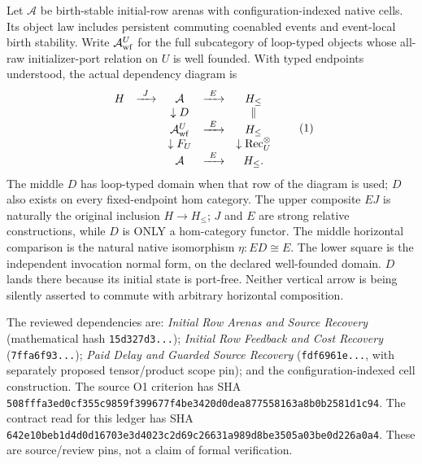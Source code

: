 \documentclass[11pt]{article}
\begin{document}
Let $\mathcal A$ be birth-stable initial-row arenas with
configuration-indexed native cells. Its object law includes persistent
commuting coenabled events and event-local birth stability. Write
$\mathcal A_{\rm wf}^{U}$ for the full subcategory of loop-typed objects
whose all-raw initializer-port relation on $U$ is well founded. With typed
endpoints understood, the actual dependency diagram is
\[
\begin{array}{ccccc}
 H&\xrightarrow{\ J\ }&\mathcal A&\xrightarrow{\ E\ }&H_{\leq}\\
 &&\downarrow D&&\Vert\\
 &&\mathcal A_{\rm wf}^{U}&\xrightarrow{\ E\ }&H_{\leq}\\
 &&\downarrow F_U&&\downarrow\operatorname{Rec}^{\otimes}_U\\
 &&\mathcal A&\xrightarrow{\ E\ }&H_{\leq}.
\end{array}                                                     \tag{1}
\]
The middle $D$ has loop-typed domain when that row of the diagram is used;
$D$ also exists on every fixed-endpoint hom category. The upper composite
$EJ$ is naturally the original inclusion $H\to H_{\leq}$; $J$ and $E$
are strong relative constructions, while $D$ is ONLY a hom-category functor.
The middle horizontal comparison is the natural native isomorphism
$\eta:E D\cong E$. The lower square is the independent invocation normal
form, on the declared well-founded domain. $D$ lands there because its
initial state is port-free. Neither vertical arrow is being silently
asserted to commute with arbitrary horizontal composition.

The reviewed dependencies are: \emph{Initial Row Arenas and Source Recovery}
(mathematical hash \texttt{15d327d3...}); \emph{Initial Row Feedback and Cost
Recovery} (\texttt{7ffa6f93...}); \emph{Paid Delay and Guarded Source Recovery}
(\texttt{fdf6961e...}, with separately proposed tensor/product scope pin);
and the configuration-indexed cell construction. The source O1 criterion
has SHA \texttt{508fffa3ed0cf355c9859f399677f4be3420d0dea877558163a8b0b2581d1c94}.
The contract read for this ledger has SHA
\texttt{642e10beb1d4d0d16703e3d4023c2d69c26631a989d8be3505a03be0d226a0a4}.
These are source/review pins, not a claim of formal verification.
\end{document}

